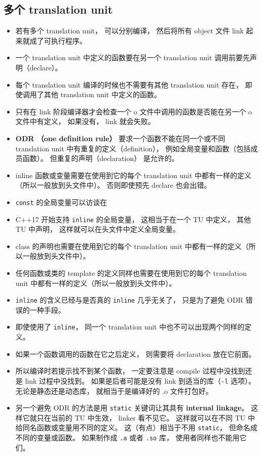 \subsection{多个  translation unit}
\begin{itemize}
\item 若有多个 translation unit， 可以分别编译， 然后将所有 object 文件 link 起来就成了可执行程序。
\item 一个 translation unit 中定义的函数要在另一个 translation unit 调用前要先声明（declare）。
\item 每个 translation unit 编译的时候也不需要有其他 translation unit 存在， 即使调用了其他 translation unit 中定义的函数。
\item 只有在 link 阶段编译器才会检查一个 o 文件中调用的函数是否能在另一个 o 文件中有定义， 如果没有， link 就会失败。
\item \textbf{ODR （one definition rule）} 要求一个函数不能在同一个或不同 translation unit 中有重复的定义（definition）， 例如全局变量和函数（包括成员函数）。 但重复的声明（declaration） 是允许的。
\item inline 函数或变量需要在使用到它的每个 translation unit 中都有一样的定义（所以一般放到头文件中）。 否则即使预先 declare 也会出错。
\item \verb|const| 的全局变量可以访谈在
\item C++17 开始支持 \verb|inline| 的全局变量， 这相当于在一个 TU 中定义， 其他 TU 中声明， 这样就可以在头文件中定义全局变量。
\item class 的声明也需要在使用到它的每个 translation unit 中都有一样的定义（所以一般放到头文件中）。
\item 任何函数或类的 template 的定义同样也需要在使用到它的每个 translation unit 中都有一样的定义（所以一般放到头文件中）。
\item \verb|inline| 的含义已经与是否真的 \verb|inline| 几乎无关了， 只是为了避免 ODR 错误的一种手段。
\item 即使使用了 \verb|inline|， 同一个 translation unit 中也不可以出现两个同样的定义。
\item 如果一个函数调用的函数在它之后定义， 则需要将 declaration 放在它前面。
\item 所以编译时若提示找不到某个函数， 一定要注意是 compile 过程中没找到还是 link 过程中没找到。 如果是后者可能是没有 link 到适当的库（\verb|-l| 选项）。 无论是静态还是动态库， 就相当于是编译好的 .o 文件打包好。
\item 另一个避免 ODR 的方法是用 \verb|static| 关键词让其具有 \textbf{internal linkage}。 这样它就只在当前的 TU 中生效， linker 看不见它。 这样就可以在不同 TU 中给同名函数或变量用不同的定义。 这（有点）相当于不用 \verb|static|， 但命名成不同的变量或函数。 如果制作成 \verb|.a| 或者 \verb|.so| 库， 使用者同样也不能用它们。
\end{itemize}

